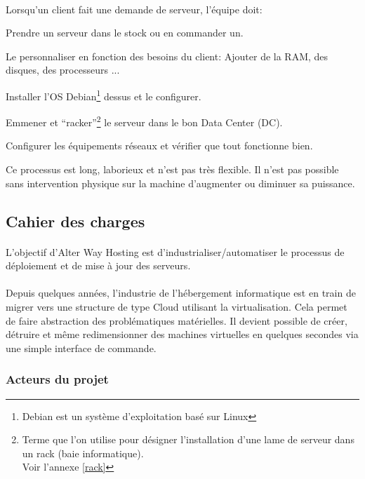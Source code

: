\paragraph*{}
Lorsqu'un client fait une demande de serveur, l'équipe doit:
\begin{listi}
	\item Prendre un serveur dans le stock ou en commander un.
	\item Le personnaliser en fonction des besoins du client: Ajouter de la RAM, des disques, des processeurs ...
	\item Installer l'OS Debian\footnote{Debian est un système d'exploitation basé sur Linux} dessus et le configurer.
	\item Emmener et ``racker''\footnote{Terme que l'on utilise pour désigner l'installation d'une lame de serveur dans un rack (baie informatique).\\
		Voir l'annexe \ref{rack}} le serveur
	dans le bon Data Center (DC).
	\item Configurer les équipements réseaux et vérifier que tout fonctionne bien.
\end{listi}

Ce processus est long, laborieux et n'est pas très flexible. Il n'est pas possible sans intervention physique sur la machine d'augmenter ou diminuer sa puissance.

\subsection{Cahier des charges}
\paragraph*{}
L'objectif d'Alter Way Hosting est d'industrialiser/automatiser le processus de déploiement et de mise à jour des serveurs.

\paragraph*{}
Depuis quelques années, l'industrie de l'hébergement informatique est en train de migrer vers une structure de type Cloud utilisant la virtualisation.
Cela permet de faire abstraction des problématiques matérielles. Il devient possible de créer, détruire et même redimensionner des machines virtuelles en
quelques secondes via une simple interface de commande.

\subsubsection{Acteurs du projet}


